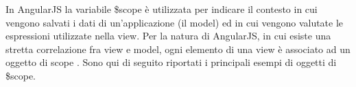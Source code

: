 In AngularJS la variabile \$scope è utilizzata per indicare il contesto in cui vengono salvati i dati di un’applicazione (il model) ed in cui vengono valutate le espressioni utilizzate nella view.
Per la natura di AngularJS, in cui esiste una stretta correlazione fra view e model, ogni elemento di una view è associato ad un oggetto di scope .
Sono qui di seguito riportati i principali esempi di oggetti di \$scope.
\begin{itemize}

%     
%     
%    
%	
%	

\end{itemize}
